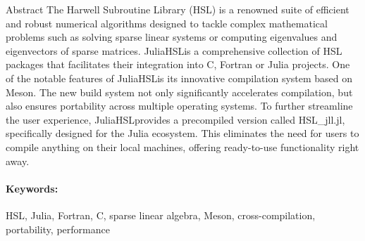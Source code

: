 \documentclass[gdweb]{geradwp}
\newcommand{\JuliaHSL}{JuliaHSL}  %
\newcommand{\HSLjll}{HSL\_jll.jl}
\begin{document}
\GDpageCouverture

\begin{GDpagetitre}

\begin{GDauthlist}
\end{GDauthlist}

\begin{GDaffillist}
\end{GDaffillist}

\begin{GDemaillist}
\end{GDemaillist}

\end{GDpagetitre}


\GDabstracts

\begin{GDabstract}{Abstract}
The Harwell Subroutine Library (HSL) is a renowned suite of efficient and robust numerical algorithms designed to tackle complex mathematical problems such as solving sparse linear systems or computing eigenvalues and eigenvectors of sparse matrices.
\JuliaHSL is a comprehensive collection of HSL packages that facilitates their integration into C, Fortran or Julia projects.
One of the notable features of \JuliaHSL is its innovative compilation system based on Meson.
The new build system not only significantly accelerates compilation, but also ensures portability across multiple operating systems.
To further streamline the user experience, \JuliaHSL provides a precompiled version called \HSLjll, specifically designed for the Julia ecosystem.
This eliminates the need for users to compile anything on their local machines, offering ready-to-use functionality right away.

\paragraph{Keywords: }
HSL, Julia, Fortran, C, sparse linear algebra, Meson, cross-compilation, portability, performance
\end{GDabstract}
\end{document}
